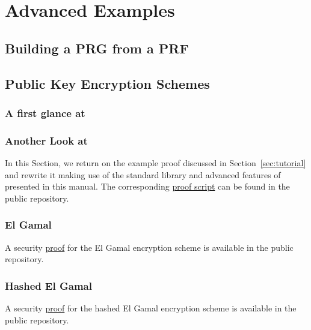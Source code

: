 
\chapter{Advanced Examples}

\section{Building a PRG from a PRF}



\section{Public Key Encryption Schemes}
\subsection{A first glance at \citet{Bellare:1993}\label{sec:tutorial}}


\subsection{Another Look at \citet{Bellare:1993}}
In this Section, we return on the example proof discussed in
Section~\ref{sec:tutorial} and rewrite it making use of the standard library and
advanced features of \EasyCrypt presented in this manual. The corresponding
\EasyCrypt \href{file:../examples/br93.ec}{proof script} can be found in the
public repository.

\subsection{El Gamal}
A security \href{file:../examples/elgamal.ec}{proof} for the El Gamal encryption scheme is available in the public
repository.

\subsection{Hashed El Gamal}
A security \href{file:../examples/hashed_elgamal.ec}{proof} for the hashed El Gamal encryption scheme is available in the
public repository.


